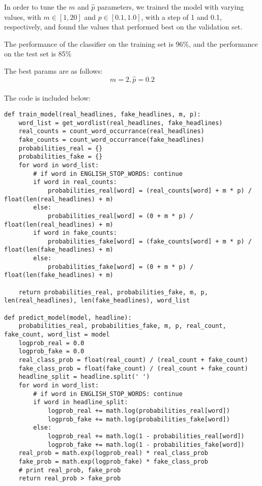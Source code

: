 \documentclass[10pt,letterpaper]{article}
\begin{document}
\begin{enumerate}
		In order to tune the $m$ and $\hat{p}$ parameters, we trained the model with varying values, with $m \in [1, 20]$ and $p\in [0.1, 1.0]$, with a step of 1 and 0.1, respectively, and found the values that performed best on the validation set.
		
		The performance of the classifier on the training set is 96\%, and the performance on the test set is 85\%
		
		The best params are as follows: \\
		\[m = 2, \hat{p} = 0.2\]
		\\
		The code is included below:
		\begin{lstlisting}
def train_model(real_headlines, fake_headlines, m, p):
    word_list = get_wordlist(real_headlines, fake_headlines)
    real_counts = count_word_occurrance(real_headlines)
    fake_counts = count_word_occurrance(fake_headlines)
    probabilities_real = {}
    probabilities_fake = {}
    for word in word_list:
        # if word in ENGLISH_STOP_WORDS: continue
        if word in real_counts:
            probabilities_real[word] = (real_counts[word] + m * p) / float(len(real_headlines) + m)
        else:
            probabilities_real[word] = (0 + m * p) / float(len(real_headlines) + m)
        if word in fake_counts:
            probabilities_fake[word] = (fake_counts[word] + m * p) / float(len(fake_headlines) + m)
        else:
            probabilities_fake[word] = (0 + m * p) / float(len(fake_headlines) + m)

    return probabilities_real, probabilities_fake, m, p, len(real_headlines), len(fake_headlines), word_list

def predict_model(model, headline):
    probabilities_real, probabilities_fake, m, p, real_count, fake_count, word_list = model
    logprob_real = 0.0
    logprob_fake = 0.0
    real_class_prob = float(real_count) / (real_count + fake_count)
    fake_class_prob = float(fake_count) / (real_count + fake_count)
    headline_split = headline.split(' ')
    for word in word_list:
        # if word in ENGLISH_STOP_WORDS: continue
        if word in headline_split:
            logprob_real += math.log(probabilities_real[word])
            logprob_fake += math.log(probabilities_fake[word])
        else:
            logprob_real += math.log(1 - probabilities_real[word])
            logprob_fake += math.log(1 - probabilities_fake[word])
    real_prob = math.exp(logprob_real) * real_class_prob
    fake_prob = math.exp(logprob_fake) * fake_class_prob
    # print real_prob, fake_prob
    return real_prob > fake_prob


\end{lstlisting}
\end{enumerate}
\end{document}
